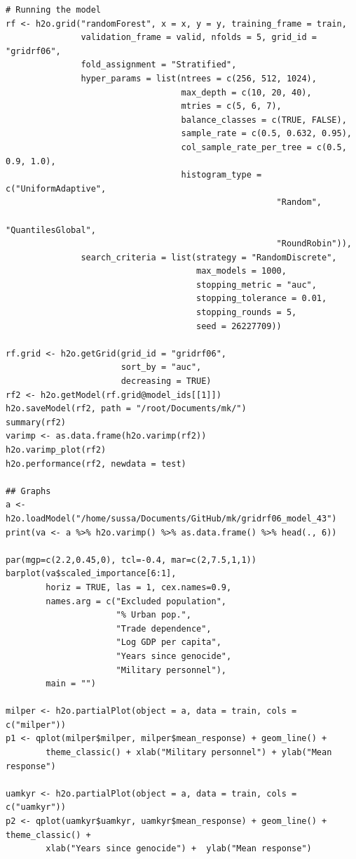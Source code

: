 \documentclass[a4paper,12pt]{article}
\begin{document}
\begin{verbatim}
# Running the model
rf <- h2o.grid("randomForest", x = x, y = y, training_frame = train, 
               validation_frame = valid, nfolds = 5, grid_id = "gridrf06",
               fold_assignment = "Stratified",
               hyper_params = list(ntrees = c(256, 512, 1024),
                                   max_depth = c(10, 20, 40),
                                   mtries = c(5, 6, 7),
                                   balance_classes = c(TRUE, FALSE),
                                   sample_rate = c(0.5, 0.632, 0.95),
                                   col_sample_rate_per_tree = c(0.5, 0.9, 1.0),
                                   histogram_type = c("UniformAdaptive",
                                                      "Random",
                                                      "QuantilesGlobal",
                                                      "RoundRobin")),
               search_criteria = list(strategy = "RandomDiscrete", 
                                      max_models = 1000, 
                                      stopping_metric = "auc", 
                                      stopping_tolerance = 0.01, 
                                      stopping_rounds = 5, 
                                      seed = 26227709)) 

rf.grid <- h2o.getGrid(grid_id = "gridrf06",
                       sort_by = "auc",
                       decreasing = TRUE)
rf2 <- h2o.getModel(rf.grid@model_ids[[1]])
h2o.saveModel(rf2, path = "/root/Documents/mk/")
summary(rf2)
varimp <- as.data.frame(h2o.varimp(rf2))
h2o.varimp_plot(rf2)
h2o.performance(rf2, newdata = test)

## Graphs
a <- h2o.loadModel("/home/sussa/Documents/GitHub/mk/gridrf06_model_43")
print(va <- a %>% h2o.varimp() %>% as.data.frame() %>% head(., 6)) 

par(mgp=c(2.2,0.45,0), tcl=-0.4, mar=c(2,7.5,1,1))
barplot(va$scaled_importance[6:1],
        horiz = TRUE, las = 1, cex.names=0.9,
        names.arg = c("Excluded population",
                      "% Urban pop.", 
                      "Trade dependence",
                      "Log GDP per capita",
                      "Years since genocide", 
                      "Military personnel"),
        main = "")
        
milper <- h2o.partialPlot(object = a, data = train, cols = c("milper"))
p1 <- qplot(milper$milper, milper$mean_response) + geom_line() +
        theme_classic() + xlab("Military personnel") + ylab("Mean response")

uamkyr <- h2o.partialPlot(object = a, data = train, cols = c("uamkyr"))
p2 <- qplot(uamkyr$uamkyr, uamkyr$mean_response) + geom_line() + theme_classic() + 
        xlab("Years since genocide") +  ylab("Mean response")
        

\end{verbatim}
\end{document}

